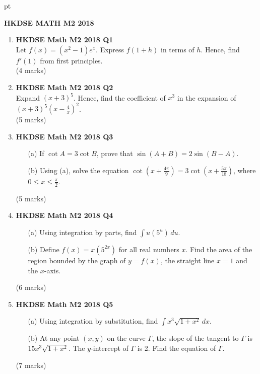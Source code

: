 \documentclass[12pt]{article}
\begin{document}
 pt
\begin{center}
	{\large \bf HKDSE MATH M2 2018}\\
	\vspace{2 mm}

\end{center}
\vspace{0.05cm}
\begin{enumerate}
	\item \textbf{HKDSE Math M2 2018 Q1}\\
	Let $\displaystyle f(x) = (x^2-1)e^x$.  Express $f(1+h)$ in terms of $h$. Hence, find  $f'(1)$ from first principles. \\(4 marks)

	\item  \textbf{HKDSE Math M2 2018 Q2}\\
	Expand $(x+3)^5$. Hence, find the coefficient of $x^3$ in the expansion of $(x+3)^5 \displaystyle\left(x - \frac{4}{x}\right) ^ 2$. \\(5 marks)

	\item \textbf{HKDSE Math M2 2018 Q3}
	\begin{enumerate}
		\item [(a)] If $\cot{A} = 3\cot{B}$, prove that $\sin{(A+B)} = 2\sin{(B-A)}$. 
		\item [(b)] Using (a), solve the equation $\displaystyle\cot{(x+\frac{4\pi}{9})} = 3\cot{(x+\frac{5\pi}{18})}$, where $0 \leq x \leq \displaystyle\frac{\pi}{2}$.
	\end{enumerate}
	(5 marks)


	\item \textbf{HKDSE Math M2 2018 Q4}
	\begin{enumerate}
		\item [(a)]Using integration by parts, find $\displaystyle\int u(5^u) \,du$. 
		\item [(b)]Define $f(x) = x(5^{2x})$ for all real numbers $x$. Find the area of the region bounded by the graph of $y = f(x)$, the straight line $x = 1$ and the $x$-axis.
	\end{enumerate}
	(6 marks)

	\item \textbf{HKDSE Math M2 2018 Q5}
	\begin{enumerate}
		\item [(a)]Using integration by substitution, find $\displaystyle\int x^3\sqrt{1 + x^2} \,dx$. 
		\item [(b)]At any point $(x,y)$ on the curve $\Gamma$, the slope of the tangent to $\Gamma$ is $15x^3\sqrt{1+x^2}$. The $y$-intercept of $\Gamma$ is 2. Find the equation of $\Gamma$.
	\end{enumerate}
	(7 marks)


\end{enumerate}
\end{document}
